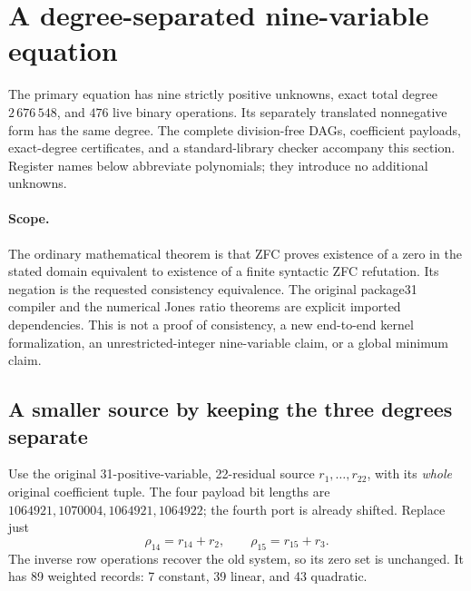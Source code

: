 \section{A degree-separated nine-variable equation}
\label{sec:nine-degree-separated}

The primary equation has nine strictly positive unknowns, exact total degree
\(2\,676\,548\), and \(476\) live binary operations.  Its separately
translated nonnegative form has the same degree.  The complete division-free
DAGs, coefficient payloads, exact-degree certificates, and a standard-library
checker accompany this section.  Register names below abbreviate polynomials;
they introduce no additional unknowns.

\paragraph{Scope.}
The ordinary mathematical theorem is that ZFC proves existence of a zero in
the stated domain equivalent to existence of a finite syntactic ZFC
refutation.  Its negation is the requested consistency equivalence.
The original package31 compiler and the numerical Jones ratio theorems are
explicit imported dependencies.  This is not a proof of consistency, a new
end-to-end kernel formalization, an unrestricted-integer nine-variable claim,
or a global minimum claim.

\subsection{A smaller source by keeping the three degrees separate}
Use the original 31-positive-variable, 22-residual source
\(r_1,\ldots,r_{22}\), with its \emph{whole} original coefficient tuple.
The four payload bit lengths are
\(1064921,1070004,1064921,1064922\); the fourth port is already shifted.
Replace just
\[
 \rho_{14}=r_{14}+r_2,\qquad \rho_{15}=r_{15}+r_3.
\]
The inverse row operations recover the old system, so its zero set is
unchanged.  It has 89 weighted records: 7 constant, 39 linear, and 43 quadratic.

